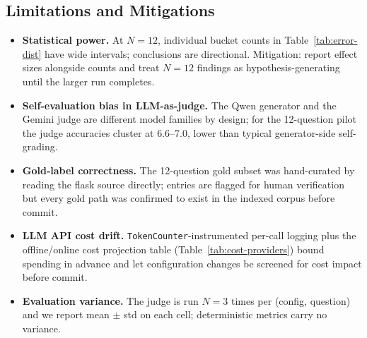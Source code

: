 \documentclass[11pt]{article}
\begin{document}
\subsection{Limitations and Mitigations}
\begin{itemize}
    \item \textbf{Statistical power.} At $N=12$, individual bucket counts in Table~\ref{tab:error-dist} have wide intervals; conclusions are directional. Mitigation: report effect sizes alongside counts and treat $N=12$ findings as hypothesis-generating until the larger run completes.
    \item \textbf{Self-evaluation bias in LLM-as-judge.} The Qwen generator and the Gemini judge are different model families by design; for the 12-question pilot the judge accuracies cluster at 6.6--7.0, lower than typical generator-side self-grading.
    \item \textbf{Gold-label correctness.} The 12-question gold subset was hand-curated by reading the flask source directly; entries are flagged for human verification but every gold path was confirmed to exist in the indexed corpus before commit.
    \item \textbf{LLM API cost drift.} \texttt{TokenCounter}-instrumented per-call logging plus the offline/online cost projection table (Table~\ref{tab:cost-providers}) bound spending in advance and let configuration changes be screened for cost impact before commit.
    \item \textbf{Evaluation variance.} The judge is run $N=3$ times per (config, question) and we report mean $\pm$ std on each cell; deterministic metrics carry no variance.
\end{itemize}

\end{document}
